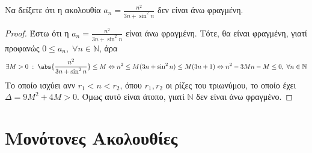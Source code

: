 \begin{enumerate}
  \item Να δείξετε ότι η ακολουθία $ a_{n} = \frac{n^{2}}{3n+ 
    \sin^{2}{n}} $ δεν είναι άνω φραγμένη.
    \begin{proof}
    \item {}
      Έστω ότι η $ a_{n}= \frac{n^{2}}{3n+ \sin^{2}{n}} $ είναι άνω φραγμένη.
      Τότε, θα είναι φραγμένη, γιατί προφανώς $ 0 \leq a_{n}, \; \forall n \in
      \mathbb{N} $, άρα
      \[
        \exists M>0 \; : \; \abs{\frac{n^{2}}{3n+ \sin^{2}{n}}} 
        \leq M \Leftrightarrow n^{2} \leq M(3n+ \sin^{2}{n}) \leq 
        M(3n+1) \Leftrightarrow n^{2}-3Mn-M \leq 0, \; \forall n \in \mathbb{N}
      \]
      Το οποίο ισχύει ανν $ r_{1}<n< r_{2} $,
      όπου $ r_{1}, r_{2} $ οι ρίζες του τριωνύμου, το οποίο έχει $ 
      \Delta= 9M^{2}+4M >0 $. Όμως αυτό είναι άτοπο, γιατί $ \mathbb{N} $ 
      δεν είναι άνω φραγμένο.
    \end{proof}
\end{enumerate}


\section{Μονότονες Ακολουθίες}


